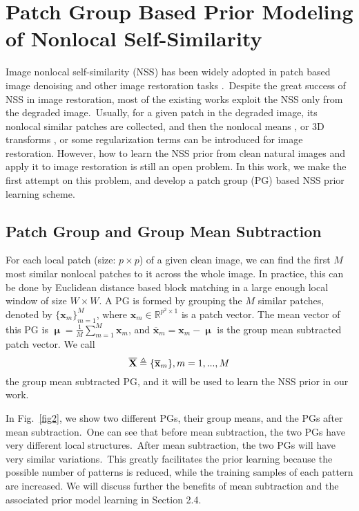 \section{Patch Group Based Prior Modeling of Nonlocal Self-Similarity}
Image nonlocal self-similarity (NSS) has been widely adopted in patch based image denoising and other image restoration tasks \cite{nlm,bm3d,lssc,ncsr,wnnm}.\ Despite the great success of NSS in image restoration, most of the existing works exploit the NSS only from the degraded image.\ Usually, for a given patch in the degraded image, its nonlocal similar patches are collected, and then the nonlocal means \cite{nlm}, or 3D transforms \cite{bm3d}, or some regularization terms \cite{lssc,ncsr,wnnm,srcolor} can be introduced for image restoration. However, how to learn the NSS prior from clean natural images and apply it to image restoration is still an open problem. In this work, we make the first attempt on this problem, and develop a patch group (PG) based NSS prior learning scheme.  
\subsection{Patch Group and Group Mean Subtraction}
For each local patch (size: $p\times p$) of a given clean image, we can find the first $M$ most similar nonlocal patches to it across the whole image. In practice, this can be done by Euclidean distance based block matching in a large enough local window of size $W\times W$. A PG is formed by grouping the $M$ similar patches, denoted by $\{\mathbf{x}_{m}\}_{m=1}^{M}$, where $\mathbf{x}_{m}\in \mathbb{R}^{p^{2}\times1}$ is a patch vector. The mean vector of this PG is $\boldsymbol{\upmu}=\frac{1}{M}\sum_{m=1}^{M}\mathbf{x}_{m}$, and $\mathbf{\overline{x}}_{m}=\mathbf{x}_{m}-\boldsymbol{\upmu}$ is the group mean subtracted patch vector. We call
\begin{equation}\label{equ1}
\setlength{\abovedisplayskip}{2pt}
\setlength{\belowdisplayskip}{2pt}
\mathbf{\overline{X}}\triangleq \{\mathbf{\overline{x}}_{m}\}, m=1,...,M
\end{equation}
the group mean subtracted PG, and it will be used to learn the NSS prior in our work. 

In Fig.\ \ref{fig2}, we show two different PGs, their group means, and the PGs after mean subtraction.\ One can see that before mean subtraction, the two PGs have very different local structures.\ After mean subtraction, the two PGs will have very similar variations.\ This greatly facilitates the prior learning because the possible number of patterns is reduced, while the training samples of each pattern are increased. We will discuss further the benefits of mean subtraction and the associated prior model learning in Section 2.4.   
